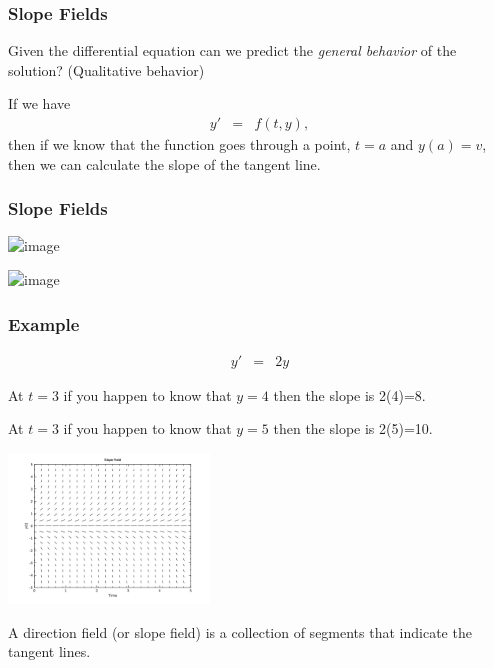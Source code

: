 \begin{frame}
  \frametitle{Slope Fields}

  Given the differential equation can we predict the {\color{red}\textit{general
    behavior}} of the solution? (Qualitative behavior)

  If we have 
  \begin{eqnarray*}
    y' & = & f(t,y),
  \end{eqnarray*}
  then if we know that the function goes through a point, $t=a$ and
  $y(a)=v$, then we can calculate the slope of the tangent line.

\end{frame}


\begin{frame}
  \frametitle{Slope Fields}

  \includegraphics<1| handout:1>[height=8cm]{img/singlePointInSlopeField}

  \includegraphics<2| handout:2>[height=8cm]{img/singlePointWithSlopeField}

\end{frame}


\begin{frame}
  \frametitle{Example}

  \vspace*{-4em}

  \begin{eqnarray*}
    y' & = & 2y
  \end{eqnarray*}

  At $t=3$ if you happen to know that $y=4$ then the slope is 2(4)=8.

  At $t=3$ if you happen to know that $y=5$ then the slope is 2(5)=10.

  \includegraphics[height=4cm]{img/week1Day2SlopeField}

  {\color{red}A direction field (or slope field) is a collection of 
  segments that indicate the tangent lines.} 
  
\end{frame}


